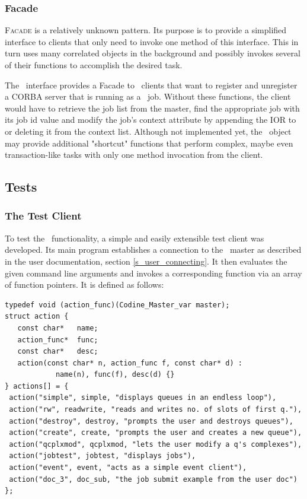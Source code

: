 \subsubsection{Facade}
\textsc{Facade} \cite[pp. xx-yy]{b_gof} is a relatively unknown pattern. Its
purpose is to provide a simplified interface to clients that only need to
invoke one method of this interface. This in turn uses many correlated
objects in the background and possibly invokes several of their functions to
accomplish the desired task.

The \master\ interface provides a Facade to \qidl\ clients that want to
register and unregister a CORBA server that is running as a \codine\ job.
Without these functions, the client would have to retrieve the job list from
the master, find the appropriate job with its job id value and modify the
job's context attribute by appending the IOR to or deleting it from the
context list. Although not implemented yet, the \master\ object may provide
additional "shortcut" functions that perform complex, maybe even
transaction-like tasks with only one method invocation from the client.

\subsection{Tests}
\subsubsection{The Test Client}
To test the \qidl\ functionality, a simple and easily extensible test client
was developed. Its main program establishes a connection to the \qidl\
master as described in the user documentation, section
\ref{s_user_connecting}. It then evaluates the given command line arguments
and invokes a corresponding function via an array of function pointers. It is
defined as follows:

\begin{Verbatim}[fontsize=\small, frame=single]
typedef void (action_func)(Codine_Master_var master);
struct action {
   const char*   name;
   action_func*  func;
   const char*   desc;
   action(const char* n, action_func f, const char* d) :
            name(n), func(f), desc(d) {}
} actions[] = {
 action("simple", simple, "displays queues in an endless loop"),
 action("rw", readwrite, "reads and writes no. of slots of first q."),
 action("destroy", destroy, "prompts the user and destroys queues"),
 action("create", create, "prompts the user and creates a new queue"),
 action("qcplxmod", qcplxmod, "lets the user modify a q's complexes"),
 action("jobtest", jobtest, "displays jobs"),
 action("event", event, "acts as a simple event client"),
 action("doc_3", doc_sub, "the job submit example from the user doc")
};
\end{Verbatim}

